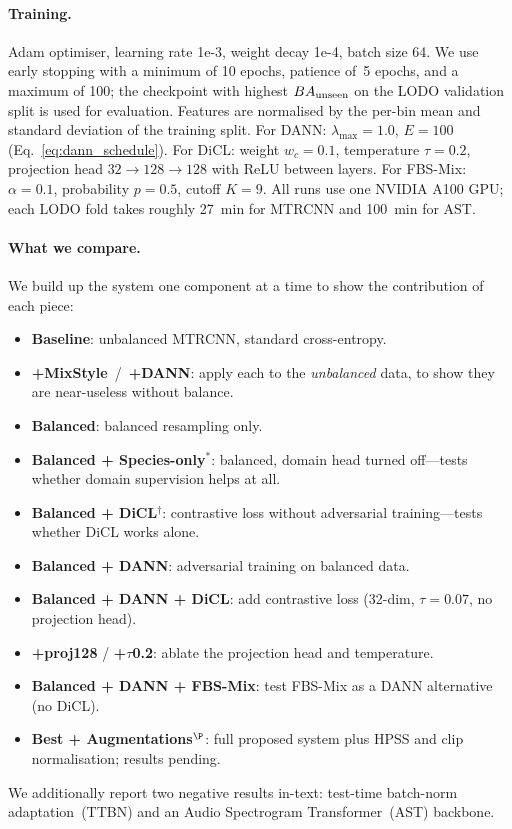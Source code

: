 \paragraph{Training.}
Adam optimiser, learning rate 1e-3, weight decay 1e-4, batch size 64.
We use early stopping with a minimum of 10 epochs, patience of~5
epochs, and a maximum of 100; the checkpoint with highest $BA_{\text{unseen}}$ on
the LODO validation split is used for evaluation.
Features are normalised by the per-bin mean and standard deviation
of the training split.
For DANN: $\lambda_{\max}{=}1.0$, $E{=}100$ (Eq.~\ref{eq:dann_schedule}).
For DiCL: weight $w_c{=}0.1$, temperature $\tau{=}0.2$, projection
head $32{\to}128{\to}128$ with ReLU between layers.
For FBS-Mix: $\alpha{=}0.1$, probability $p{=}0.5$, cutoff $K{=}9$.
All runs use one NVIDIA A100 GPU; each LODO fold takes roughly 27~min
for MTRCNN and 100~min for AST.

\paragraph{What we compare.}
We build up the system one component at a time to show the
contribution of each piece:
\begin{itemize}
  \item \textbf{Baseline}: unbalanced MTRCNN, standard cross-entropy.
  \item \textbf{+MixStyle}~/~\textbf{+DANN}: apply each to the
    \emph{unbalanced} data, to show they are near-useless without
    balance.
  \item \textbf{Balanced}: balanced resampling only.
  \item \textbf{Balanced + Species-only}$^*$: balanced, domain head
    turned off---tests whether domain supervision helps at all.
  \item \textbf{Balanced + DiCL}$^\dagger$: contrastive loss without
    adversarial training---tests whether DiCL works alone.
  \item \textbf{Balanced + DANN}: adversarial training on balanced data.
  \item \textbf{Balanced + DANN + DiCL}: add contrastive loss (32-dim,
    $\tau{=}0.07$, no projection head).
  \item \textbf{+proj128} / \textbf{+$\tau$0.2}: ablate the projection
    head and temperature.
  \item \textbf{Balanced + DANN + FBS-Mix}: test FBS-Mix as a
    DANN alternative (no DiCL).
  \item \textbf{Best + Augmentations$^\P$}: full proposed system plus
    HPSS and clip normalisation; results pending.
\end{itemize}
We additionally report two negative results in-text: test-time
batch-norm adaptation~(TTBN) and an Audio Spectrogram
Transformer~(AST) backbone.
